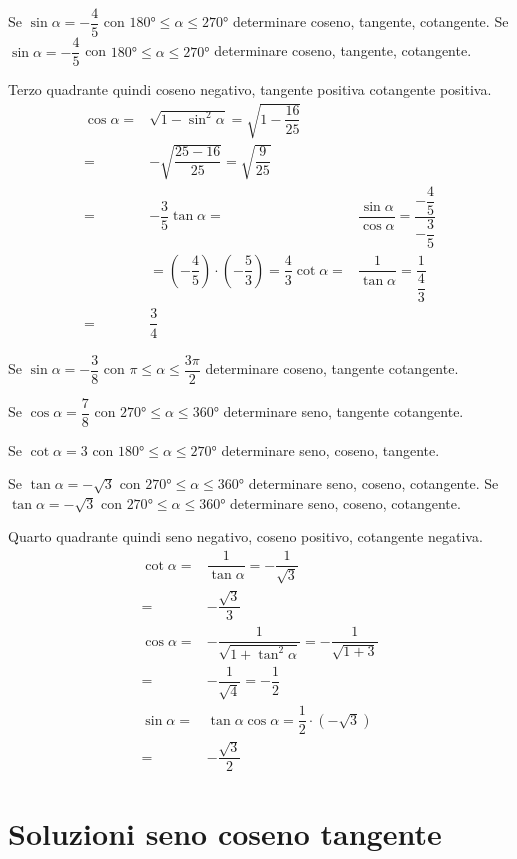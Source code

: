 \begin{exercise}
	Se $\sin\alpha=-\dfrac{4}{5}$ con $\ang{180}\leq\alpha\leq\ang{270}$ determinare  coseno, tangente, cotangente.
	\tcblower	
Se $\sin\alpha=-\dfrac{4}{5}$ con $\ang{180}\leq\alpha\leq\ang{270}$ determinare  coseno, tangente, cotangente.
	
Terzo quadrante quindi coseno negativo, tangente positiva cotangente positiva.
	\begin{align*}
	\cos\alpha=&\sqrt{1-\sin^2\alpha}=\sqrt{1-\dfrac{16}{25}}\\
	=&-\sqrt{\dfrac{25-16}{25}}=\sqrt{\dfrac{9}{25}}\\
	=&-\dfrac{3}{5}
	\tan\alpha=&\dfrac{\sin\alpha}{\cos\alpha}=\dfrac{-\dfrac{4}{5}}{-\dfrac{3}{5}}\\
	&=\left(-\dfrac{4}{5}\right)\cdot\left(-\dfrac{5}{3}\right)=\dfrac{4}{3}
	\cot\alpha=&\dfrac{1}{\tan\alpha}=\dfrac{1}{\dfrac{4}{3}}\\
	=&\dfrac{3}{4}
	\end{align*}	
\end{exercise}
\begin{exercise}[no solution]
	Se $\sin\alpha=-\dfrac{3}{8}$  con $\pi\leq\alpha\leq\dfrac{3\pi}{2}$ determinare coseno, tangente cotangente.
\end{exercise}
\begin{exercise}[no solution]
	Se $\cos\alpha=\dfrac{7}{8}$  con $\ang{270}\leq\alpha\leq\ang{360}$ determinare seno, tangente cotangente.
\end{exercise}
\begin{exercise}[no solution]
	Se $\cot\alpha=3$ con $\ang{180}\leq\alpha\leq\ang{270}$ determinare seno, coseno, tangente.
\end{exercise}
\begin{exercise}
	Se $\tan\alpha=-\sqrt{3}$ con $\ang{270}\leq\alpha\leq\ang{360}$ determinare seno, coseno, cotangente.
\tcblower	
	Se $\tan\alpha=-\sqrt{3}$ con $\ang{270}\leq\alpha\leq\ang{360}$ determinare seno, coseno, cotangente.

Quarto quadrante quindi seno negativo, coseno positivo, cotangente negativa.
\begin{align*}
\cot\alpha=&\dfrac{1}{\tan\alpha}=-\dfrac{1}{\sqrt{3}}\\
=&-\dfrac{\sqrt{3}}{3}\\
\cos\alpha=&-\dfrac{1}{\sqrt{1+\tan^2\alpha}}=-\dfrac{1}{\sqrt{1+3}}\\
=&-\dfrac{1}{\sqrt{4}}=-\dfrac{1}{2}\\
\sin\alpha=&\tan\alpha\cos\alpha=\dfrac{1}{2}\cdot\left(-\sqrt{3}\right)\\
=&-\dfrac{\sqrt{3}}{2}
\end{align*}	
\end{exercise}
\tcbstoprecording
\newpage
\section{Soluzioni seno coseno tangente}
\tcbinputrecords
